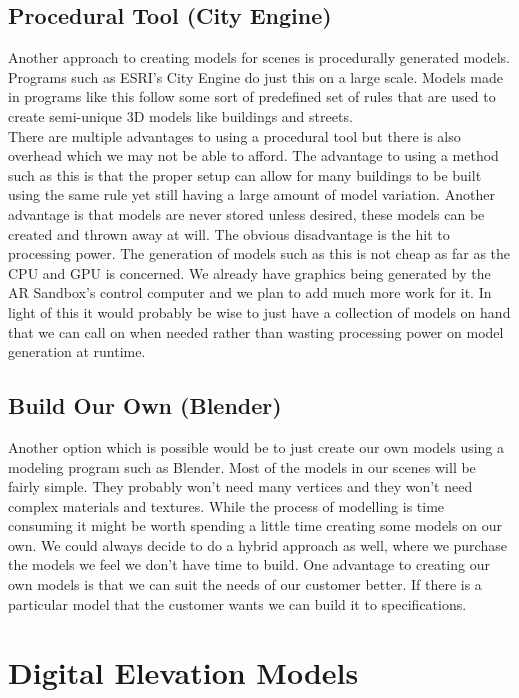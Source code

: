\documentclass[letterpaper, 10pt, onecolumn, draftclsnofoot]{IEEEtran}
\begin{document}
    \subsection{Procedural Tool (City Engine)}
    Another approach to creating models for scenes is procedurally generated models. Programs such as ESRI’s City Engine do just this on a large scale. Models made in programs like this follow some sort of predefined set of rules that are used to create semi-unique 3D models like buildings and streets.\\
    There are multiple advantages to using a procedural tool but there is also overhead which we may not be able to afford. The advantage to using a method such as this is that the proper setup can allow for many buildings to be built using the same rule yet still having a large amount of model variation. Another advantage is that models are never stored unless desired, these models can be created and thrown away at will. The obvious disadvantage is the hit to processing power. The generation of models such as this is not cheap as far as the CPU and GPU is concerned. We already have graphics being generated by the AR Sandbox’s control computer and we plan to add much more work for it. In light of this it would probably be wise to just have a collection of models on hand that we can call on when needed rather than wasting processing power on model generation at runtime.

    \subsection{Build Our Own (Blender)}
    Another option which is possible would be to just create our own models using a modeling program such as Blender. Most of the models in our scenes will be fairly simple. They probably won’t need many vertices and they won’t need complex materials and textures. While the process of modelling is time consuming it might be worth spending a little time creating some models on our own. We could always decide to do a hybrid approach as well, where we purchase the models we feel we don’t have time to build. One advantage to creating our own models is that we can suit the needs of our customer better. If there is a particular model that the customer wants we can build it to specifications.

\section{Digital Elevation Models}
\end{document}
